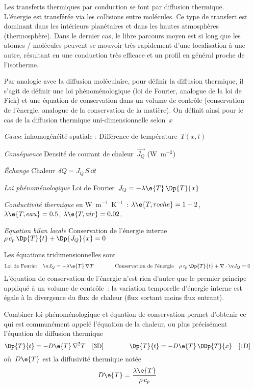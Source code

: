 \sk
Les transferts thermiques par conduction se font par diffusion thermique. L'énergie est transférée via les collisions entre molécules. Ce type de transfert est dominant dans les intérieurs planétaires et dans les hautes atmosphères (thermosphère). Dans le dernier cas, le libre parcours moyen est si long que les atomes / molécules peuvent se mouvoir très rapidement d'une localisation à une autre, résultant en une conduction très efficace et un profil en général proche de l'isotherme.

\sk
Par analogie avec la diffusion moléculaire, pour définir la diffusion thermique, il s'agit de définir une loi phénoménologique (loi de Fourier, analogue de la loi de Fick) et une équation de conservation dans un volume de contrôle (conservation de l'énergie, analogue de la conservation de la matière). On définit ainsi pour le cas de la diffusion thermique uni-dimensionnelle selon~$x$
\begin{citemize}
\item \textit{Cause} inhomogénéité spatiale : Différence de température~$T(x,t)$
\item \textit{Conséquence} Densité de courant de chaleur~$\vec{J_Q}$ (W~m$^{-2}$)
\item \textit{\'Echange} Chaleur~$\delta Q = J_Q \, S \, \dd t$
\item \textit{Loi phénoménologique} Loi de Fourier~$J_Q = - \lambda\e{T} \, \Dp{T}{x}$
\item \textit{Conductivité thermique} en W~m$^{-1}$~K$^{-1}$~: $\lambda\e{T,roche} = 1-2$, $\lambda\e{T,eau} = 0.5$, $\lambda\e{T,air} = 0.02$.
\item \textit{Equation bilan locale} Conservation de l'énergie interne~$ \rho \, c_p \, \Dp{T}{t} + \Dp{J_Q}{x} = 0 $
\end{citemize}

\sk
Les équations tridimensionnelles sont
\[  
\textrm{Loi de Fourier} \quad \vec{J_Q} = - \lambda\e{T} \, \nabla T 
\qquad \qquad
\textrm{Conservation de l'énergie} \quad \rho \, c_p \, \Dp{T}{t} + \nabla \cdot \vec{J_Q} = 0
\]
\noindent L'équation de conservation de l'énergie n'est rien d'autre que le premier principe appliqué à un volume de contrôle~: la variation temporelle d'énergie interne est égale à la divergence du flux de chaleur (flux sortant moins flux entrant).

\sk
Combiner loi phénoménologique et équation de conservation permet d'obtenir ce qui est communément appelé l'équation de la chaleur, ou plus précisément l'équation de diffusion thermique
\[ \Dp{T}{t} = - D\e{T} \, \nabla^2 T \quad \textrm{[3D]} \qquad \qquad \Dp{T}{t} = - D\e{T} \, \DDp{T}{x} \quad \textrm{[1D]} \]
\noindent où~$D\e{T}$ est la diffusivité thermique notée
\[ D\e{T} = \frac{\lambda\e{T}}{\rho \, c_p} \]

